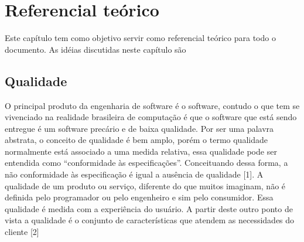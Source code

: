 
\chapter[Referencial Teórico]{Referencial teórico}
	
	Este capítulo tem como objetivo servir como referencial teórico para todo o documento. As idéias discutidas neste capítulo são
	
\section{Qualidade}
	O principal produto da engenharia de software é o software, contudo o que tem se vivenciado na realidade brasileira de computação é que o software que está sendo entregue é um software precário e de baixa qualidade. Por ser uma palavra abstrata, o conceito de qualidade é bem amplo, porém o termo qualidade normalmente está associado a uma medida relativa, essa qualidade pode ser entendida como “conformidade às especificações”. Conceituando dessa forma, a não conformidade às especificação é igual a ausência de qualidade [1].
A qualidade de um produto ou serviço, diferente do que muitos imaginam, não é definida pelo programador ou pelo engenheiro e sim pelo consumidor. Essa qualidade é medida com a experiência do usuário. A partir deste outro ponto de vista a qualidade é o conjunto de características que atendem as necessidades do cliente [2]

	  
\